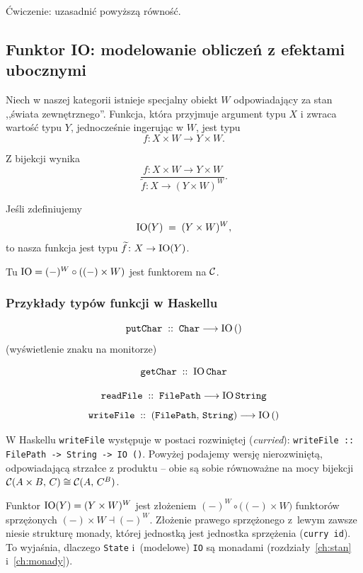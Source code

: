 \begin{uwaga}
Ćwiczenie: uzasadnić powyższą równość.
\end{uwaga}

\subsection*{Funktor IO: modelowanie obliczeń z efektami ubocznymi}

Niech w naszej kategorii istnieje specjalny obiekt $W$ odpowiadający za stan ,,świata zewnętrznego''. Funkcja, która przyjmuje argument typu $X$ i zwraca wartość typu $Y$, jednocześnie ingerując w $W$, jest typu
\[
f \colon X\times W \longrightarrow Y\times W.
\]

Z bijekcji wynika
\[
\frac{f\colon X\times W \longrightarrow Y\times W}{\widetilde{f}\colon X \longrightarrow (Y\times W)^{W}}.
\]

Jeśli zdefiniujemy
\[
\mathrm{IO}(Y) \;=\; (Y\times W)^{W},
\]
to nasza funkcja jest typu $\widetilde{f}\colon X \to \mathrm{IO}(Y)$.

Tu $\mathrm{IO} = (-)^W \circ ((-)\times W)$ jest funktorem na $\mathcal{C}$.

\subsubsection*{Przykłady typów funkcji w Haskellu}

\[
\texttt{putChar} \;::\; \texttt{Char} \longrightarrow \mathrm{IO}\,()
\]
(wyświetlenie znaku na monitorze)

\[
\texttt{getChar} \;::\; \mathrm{IO}\,\texttt{Char}
\]

\[
\texttt{readFile} \;::\; \texttt{FilePath} \longrightarrow \mathrm{IO}\,\texttt{String}
\]
\[
\texttt{writeFile} \;::\; (\texttt{FilePath},\, \texttt{String}) \longrightarrow \mathrm{IO}\,()
\]

\begin{uwaga}
W Haskellu \texttt{writeFile} występuje w postaci rozwiniętej (\emph{curried}): \texttt{writeFile :: FilePath -> String -> IO ()}. Powyżej podajemy wersję nierozwiniętą, odpowiadającą strzałce z produktu -- obie są sobie równoważne na mocy bijekcji $\mathcal{C}(A \times B,\, C) \cong \mathcal{C}(A,\, C^B)$.
\end{uwaga}

\begin{uwaga}[IO i State]
Funktor $\mathrm{IO}(Y) = (Y\times W)^W$ jest złożeniem $(-)^W\circ\bigl((-)\times W\bigr)$ funktorów sprzężonych $(-)\times W\dashv(-)^W$. Złożenie prawego sprzężonego z~lewym zawsze niesie strukturę monady, której jednostką jest jednostka sprzężenia (\lstinline{curry id}). To wyjaśnia, dlaczego \lstinline{State} i~(modelowe) \lstinline{IO} są monadami (rozdziały~\ref{ch:stan} i~\ref{ch:monady}).
\end{uwaga}

